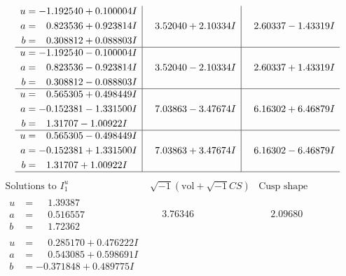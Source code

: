 \documentclass[1p]{elsarticle_modified}
\theoremstyle{definition}
\newcommand{\I}{\sqrt{-1}}
\begin{document}
$$\begin{array}{c|c|c}
\begin{aligned}
u &= -1.192540 + 0.100004 I \\
a &= \phantom{-}0.823536 + 0.923814 I \\
b &= \phantom{-}0.308812 + 0.088803 I\end{aligned}
 & \phantom{-}3.52040 + 2.10334 I & \phantom{-}2.60337 - 1.43319 I \\ \hline\begin{aligned}
u &= -1.192540 - 0.100004 I \\
a &= \phantom{-}0.823536 - 0.923814 I \\
b &= \phantom{-}0.308812 - 0.088803 I\end{aligned}
 & \phantom{-}3.52040 - 2.10334 I & \phantom{-}2.60337 + 1.43319 I \\ \hline\begin{aligned}
u &= \phantom{-}0.565305 + 0.498449 I \\
a &= -0.152381 - 1.331500 I \\
b &= \phantom{-}1.31707 - 1.00922 I\end{aligned}
 & \phantom{-}7.03863 - 3.47674 I & \phantom{-}6.16302 + 6.46879 I \\ \hline\begin{aligned}
u &= \phantom{-}0.565305 - 0.498449 I \\
a &= -0.152381 + 1.331500 I \\
b &= \phantom{-}1.31707 + 1.00922 I\end{aligned}
 & \phantom{-}7.03863 + 3.47674 I & \phantom{-}6.16302 - 6.46879 I\\
 \hline 
 \end{array}$$\newpage$$\begin{array}{c|c|c}  
\text{Solutions to }I^u_{1}& \I (\text{vol} + \sqrt{-1}CS) & \text{Cusp shape}\\
 \hline 
\begin{aligned}
u &= \phantom{-}1.39387\phantom{ +0.000000I} \\
a &= \phantom{-}0.516557\phantom{ +0.000000I} \\
b &= \phantom{-}1.72362\phantom{ +0.000000I}\end{aligned}
 & \phantom{-}3.76346\phantom{ +0.000000I} & \phantom{-}2.09680\phantom{ +0.000000I} \\ \hline\begin{aligned}
u &= \phantom{-}0.285170 + 0.476222 I \\
a &= \phantom{-}0.543085 + 0.598691 I \\
b &= -0.371848 + 0.489775 I\end{aligned}

\end{array}$$
\end{document}
